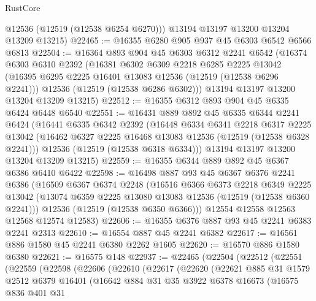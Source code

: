 \begin{lexlean}{RustCore}
\begin{coremodule}
        @12536
        (@12519 (@12538 @6254 @6270)))
      @13194
      @13197
      @13200
      @13204
      @13209
      @13215)
@22465 := @16355 @6280 @905 @937 @45 @6303 @6542 @6566 @6813
@22504 := @16364
    @893
    @904
    @45
    @6303
    @6312
    @2241
    @6542
    (@16374
      @6303
      @6310
      @2392
      (@16381
        @6302
        @6309
        @2218
        @6285
        @2225
        @13042
        (@16395 @6295 @2225 @16401 @13083 @12536 (@12519 (@12538 @6296 @2241)))
        @12536
        (@12519 (@12538 @6286 @6302)))
      @13194
      @13197
      @13200
      @13204
      @13209
      @13215)
@22512 := @16355 @6312 @893 @904 @45 @6335 @6424 @6448 @6540
@22551 := @16431
    @889
    @892
    @45
    @6335
    @6344
    @2241
    @6424
    (@16441
      @6335
      @6342
      @2392
      (@16448
        @6334
        @6341
        @2218
        @6317
        @2225
        @13042
        (@16462 @6327 @2225 @16468 @13083 @12536 (@12519 (@12538 @6328 @2241)))
        @12536
        (@12519 (@12538 @6318 @6334)))
      @13194
      @13197
      @13200
      @13204
      @13209
      @13215)
@22559 := @16355 @6344 @889 @892 @45 @6367 @6386 @6410 @6422
@22598 := @16498
    @887
    @93
    @45
    @6367
    @6376
    @2241
    @6386
    (@16509
      @6367
      @6374
      @2248
      (@16516
        @6366
        @6373
        @2218
        @6349
        @2225
        @13042
        (@13074 @6359 @2225 @13080 @13083 @12536 (@12519 (@12538 @6360 @2241)))
        @12536
        (@12519 (@12538 @6350 @6366)))
      @12554
      @12558
      @12563
      @12568
      @12574
      @12583)
@22606 := @16355 @6376 @887 @93 @45 @2241 @6383 @2241 @2313
@22610 := @16554 @887 @45 @2241 @6382
@22617 := @16561 @886 @1580 @45 @2241 @6380 @2262 @1605
@22620 := @16570 @886 @1580 @6380
@22621 := @16575 @148
@22937 := @22465
    (@22504
      (@22512
        (@22551
          (@22559
            (@22598
              (@22606
                (@22610
                  (@22617
                    (@22620
                      (@22621
                        @885
                        @31
                        @1579
                        @2512
                        @6379
                        @16401
                        (@16642
                          @884
                          @31
                          @35
                          @3922
                          @6378
                          @16673
                          (@16575
                            @836
                            @401
                            @31

\end{coremodule}
\end{lexlean}
